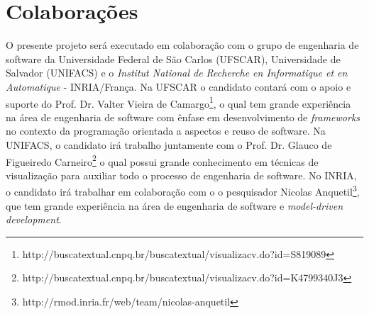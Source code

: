 \documentclass[12pt]{article}
\begin{document}
\section{Colaborações}

O presente projeto será executado em colaboração com o grupo de engenharia de software da
Universidade Federal de São Carlos (UFSCAR), Universidade de Salvador (UNIFACS) e o \textit{Institut National de Recherche en Informatique et en Automatique} - INRIA/França. Na UFSCAR o candidato contará com o apoio e suporte do Prof. Dr. Valter Vieira de Camargo\footnote{http://buscatextual.cnpq.br/buscatextual/visualizacv.do?id=S819089}, o qual tem grande experiência na área de engenharia de software com ênfase em desenvolvimento de \textit{frameworks} no contexto da programação orientada a aspectos e reuso de software. Na UNIFACS, o candidato irá trabalho juntamente com o Prof. Dr. Glauco de Figueiredo Carneiro\footnote{http://buscatextual.cnpq.br/buscatextual/visualizacv.do?id=K4799340J3} o qual possui grande conhecimento em técnicas de visualização para auxiliar todo o processo de engenharia de software. No INRIA, o candidato irá trabalhar em colaboração com o o pesquisador Nicolas Anquetil\footnote{http://rmod.inria.fr/web/team/nicolas-anquetil}, que tem grande experiência na área de engenharia de software e \textit{model-driven development}.




\end{document}
